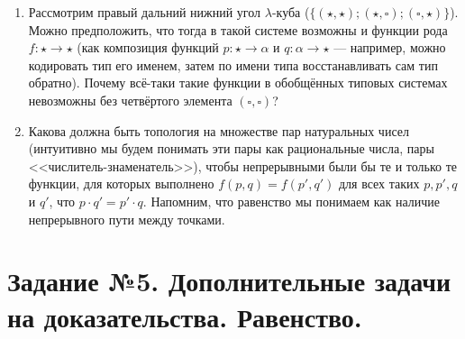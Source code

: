 \documentclass[10pt,a4paper,oneside]{article}
\begin{document}
\begin{enumerate}
\item Рассмотрим правый дальний нижний угол $\lambda$-куба ($\{(\star,\star);(\star,\square);(\square,\star)\}$).
Можно предположить, что тогда в такой системе возможны и функции рода $f: \star\rightarrow\star$ 
(как композиция функций $p: \star\rightarrow\alpha$ и $q: \alpha\rightarrow\star$ ---
например, можно кодировать тип его именем, затем по имени типа восстанавливать сам тип обратно).
Почему всё-таки такие функции в обобщённых типовых системах невозможны без четвёртого элемента $(\square,\square)$?

\item Какова должна быть топология на множестве
пар натуральных чисел (интуитивно мы будем понимать эти пары как рациональные числа, пары <<числитель-знаменатель>>), 
чтобы непрерывными были бы те и только те функции, для которых выполнено $f(p,q) = f(p',q')$ для всех 
таких $p,p',q$ и $q'$, что $p\cdot q' = p'\cdot q$. Напомним, что равенство мы понимаем как наличие непрерывного пути 
между точками.
\end{enumerate}

\section*{Задание №5. Дополнительные задачи на доказательства. Равенство.}
\end{document}

